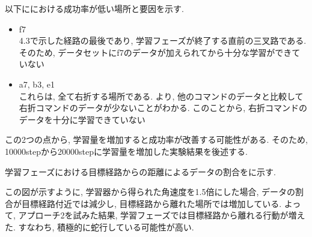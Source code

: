   \newpage
  
  以下ににおける成功率が低い場所と要因を示す.
  \begin{itemize}
    \item f7\\
    4.3で示した経路の最後であり, 学習フェーズが終了する直前の三叉路である. そのため, データセットにf7のデータが加えられてから十分な学習ができていない
    \item a7, b3, e1\\
    これらは, 全て右折する場所である. より, 他のコマンドのデータと比較して右折コマンドのデータが少ないことがわかる. このことから, 右折コマンドのデータを十分に学習できていない
  \end{itemize} 

  この2つの点から, 学習量を増加すると成功率が改善する可能性がある. そのため, 10000stepから20000stepに学習量を増加した実験結果を後述する.

  \newpage


  学習フェーズにおける目標経路からの距離によるデータの割合をに示す. \par
  この図が示すように, 学習器から得られた角速度を1.5倍にした場合, データの割合が目標経路付近では減少し, 目標経路から離れた場所では増加している. よって, アプローチ2を試みた結果, 学習フェーズでは目標経路から離れる行動が増えた. すなわち, 積極的に蛇行している可能性が高い.


